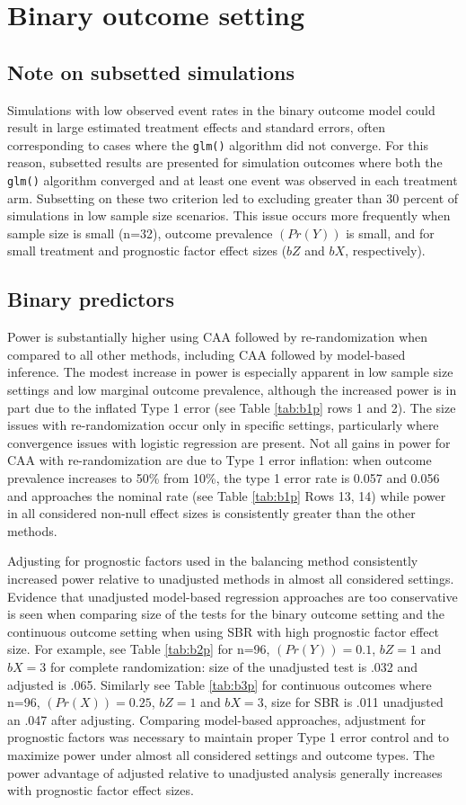 \section{Binary outcome setting}
\subsection{Note on subsetted simulations}
Simulations with low observed event rates in the binary outcome model could result in large estimated treatment effects and standard errors, often corresponding to cases where the \texttt{glm()} algorithm did not converge.
For this reason, subsetted results are presented for simulation outcomes where both the \texttt{glm()} algorithm converged and at least one event was observed in each treatment arm.
Subsetting on these two criterion led to excluding greater than 30 percent of simulations in low sample size scenarios.
This issue occurs more frequently when sample size is small (n=32), outcome prevalence $(Pr(Y))$ is small, and for small treatment and prognostic factor effect sizes ($bZ$ and $bX$, respectively). 

\subsection{Binary predictors}
Power is substantially higher using CAA followed by re-randomization when compared to all other methods, including CAA followed by model-based inference.
The modest increase in power is especially apparent in low sample size settings and low marginal outcome prevalence, although the increased power is in part due to the inflated Type 1 error (see Table \ref{tab:b1p} rows 1 and 2).
The size issues with re-randomization occur only in specific settings, particularly where convergence issues with logistic regression are present.
Not all gains in power for CAA with re-randomization are due to Type 1 error inflation: when outcome prevalence increases to 50\% from 10\%, the type 1 error rate is 0.057 and 0.056 and approaches the nominal rate (see Table \ref{tab:b1p} Rows 13, 14) while power in all considered non-null effect sizes is consistently greater than the other methods.

Adjusting for prognostic factors used in the balancing method consistently increased power relative to unadjusted methods in almost all considered settings.
Evidence that unadjusted model-based regression approaches are too conservative is seen when comparing size of the tests for the binary outcome setting and the continuous outcome setting when using SBR with high prognostic factor effect size.
For example, see Table \ref{tab:b2p} for n=96, $(Pr(Y))=0.1$, $bZ=1$ and $bX=3$ for complete randomization: size of the unadjusted test is .032 and adjusted is .065. 
Similarly see Table \ref{tab:b3p} for continuous outcomes where n=96, $(Pr(X))=0.25$, $bZ=1$ and $bX=3$, size for SBR is .011 unadjusted an .047 after adjusting. 
Comparing model-based approaches, adjustment for prognostic factors was necessary to maintain proper Type 1 error control and to maximize power under almost all considered settings and outcome types.
The power advantage of adjusted relative to unadjusted analysis generally increases with prognostic factor effect sizes. 

